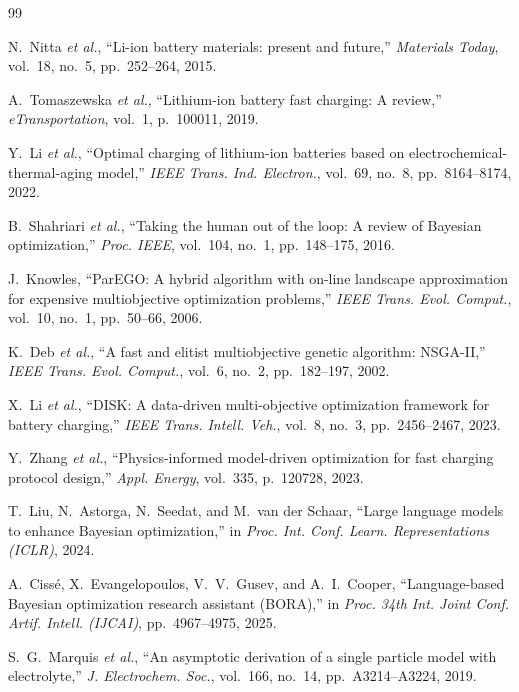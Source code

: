 \documentclass[journal]{IEEEtran}
\begin{document}
\begin{thebibliography}{99}

N.~Nitta \textit{et al.}, ``Li-ion battery materials: present and future,''
\textit{Materials Today}, vol.~18, no.~5, pp.~252--264, 2015.

A.~Tomaszewska \textit{et al.}, ``Lithium-ion battery fast charging: A review,''
\textit{eTransportation}, vol.~1, p.~100011, 2019.

Y.~Li \textit{et al.}, ``Optimal charging of lithium-ion batteries based on
electrochemical-thermal-aging model,'' \textit{IEEE Trans. Ind. Electron.},
vol.~69, no.~8, pp.~8164--8174, 2022.

B.~Shahriari \textit{et al.}, ``Taking the human out of the loop: A review of
Bayesian optimization,'' \textit{Proc. IEEE}, vol.~104, no.~1, pp.~148--175, 2016.

J.~Knowles, ``ParEGO: A hybrid algorithm with on-line landscape approximation
for expensive multiobjective optimization problems,''
\textit{IEEE Trans. Evol. Comput.}, vol.~10, no.~1, pp.~50--66, 2006.

K.~Deb \textit{et al.}, ``A fast and elitist multiobjective genetic algorithm:
NSGA-II,'' \textit{IEEE Trans. Evol. Comput.}, vol.~6, no.~2, pp.~182--197, 2002.

X.~Li \textit{et al.}, ``DISK: A data-driven multi-objective optimization
framework for battery charging,'' \textit{IEEE Trans. Intell. Veh.},
vol.~8, no.~3, pp.~2456--2467, 2023.

Y.~Zhang \textit{et al.}, ``Physics-informed model-driven optimization for
fast charging protocol design,'' \textit{Appl. Energy}, vol.~335, p.~120728, 2023.

T.~Liu, N.~Astorga, N.~Seedat, and M.~van der Schaar,
``Large language models to enhance Bayesian optimization,'' in
\textit{Proc. Int. Conf. Learn. Representations (ICLR)}, 2024.

A.~Ciss\'e, X.~Evangelopoulos, V.~V.~Gusev, and A.~I.~Cooper,
``Language-based Bayesian optimization research assistant (BORA),'' in
\textit{Proc. 34th Int. Joint Conf. Artif. Intell. (IJCAI)},
pp.~4967--4975, 2025.

S.~G.~Marquis \textit{et al.}, ``An asymptotic derivation of a single particle
model with electrolyte,'' \textit{J. Electrochem. Soc.}, vol.~166, no.~14,
pp.~A3214--A3224, 2019.


\end{thebibliography}
\end{document}
